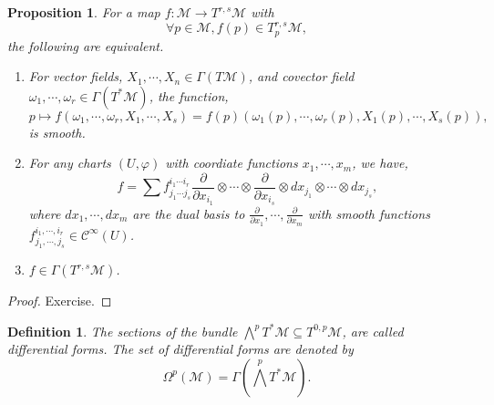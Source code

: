 \documentclass[10pt]{article}
\newtheorem{proposition}{Proposition}[section]
\newtheorem{definition}{Definition}[section]
\newcommand{\M}[0]{\mathcal{M}}
\newcommand{\cinf}[0]{\mathcal{C}^\infty}
\newcommand{\pd}[2]{{\frac {\partial #1} {\partial #2}}}
\begin{document}
\begin{proposition}
  For a map $f:\M\to T^{r,s}\M$ with 
  \begin{equation*}
   \forall p\in\M, f(p)\in T_p^{r,s}\M,
  \end{equation*}
  the following are equivalent.
  \begin{enumerate}[1).]
    \item For vector fields, $X_1,\cdots,X_n\in\Gamma(T\M)$, and covector field $\omega_1,\cdots,\omega_r\in\Gamma(T^*\M)$, the function, 
    \begin{equation*}
      p\mapsto f(\omega_1,\cdots,\omega_r,X_1,\cdots,X_s) = f(p)(\omega_1(p),\cdots,\omega_r(p),X_1(p),\cdots,X_s(p)),
    \end{equation*}
    is smooth.
    \item For any charts $(U,\varphi)$ with coordiate functions $x_1,\cdots,x_m$, we have,
      \begin{equation*}
        f = \sum f_{j_1\cdots j_s}^{i_1\cdots i_r}\pd{}{x_{i_1}}\otimes\cdots\otimes \pd{}{x_{i_s}}\otimes dx_{j_1}\otimes \cdots\otimes dx_{j_s},
      \end{equation*}
      where $dx_1,\cdots,dx_m$ are the dual basis to $\pd{}{x_1},\cdots,\pd{}{x_m}$ with smooth functions $f_{j_1,\cdots,j_s}^{i_1,\cdots,i_r}\in\cinf(U)$.
      \item $f\in\Gamma(T^{r,s}\M)$.
  \end{enumerate}
  \label{proposition_12_2}
\end{proposition}

\begin{proof}
  Exercise.
\end{proof}

\begin{definition}
  The sections of the bundle $\bigwedge^pT^*\M\subseteq T^{0,p}\M$, are called differential forms. The set of differential forms are denoted by 
  \begin{equation*}
    \Omega^p(\M) = \Gamma\left(\bigwedge^pT^*\M\right).
  \end{equation*}
\end{definition}
\end{document}
